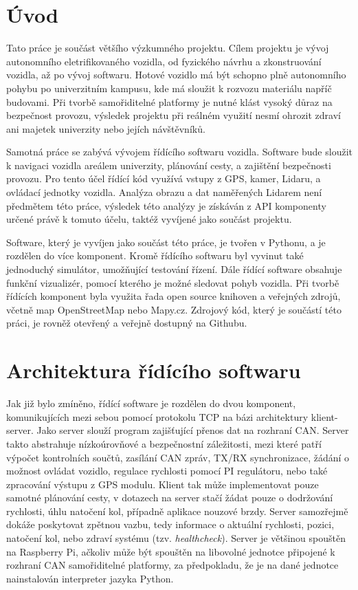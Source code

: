 \documentclass[czech, bachelor]{diploma}
\begin{document}
\MakeTitlePages

\chapter{Úvod} \label{sec:Introduction}
Tato práce je součást většího výzkumného projektu. Cílem projektu je vývoj autonomního eletrifikovaného vozidla,
od fyzického návrhu a zkonstruování vozidla, až po vývoj softwaru. Hotové vozidlo má být schopno plně autonomního pohybu
po univerzitním kampusu, kde má sloužit k rozvozu materiálu napříč budovami. Při tvorbě samořiditelné platformy je nutné
klást vysoký důraz na bezpečnost provozu, výsledek projektu při reálném využití nesmí ohrozit zdraví ani majetek
univerzity nebo jejích návštěvníků.

Samotná práce se zabývá vývojem řídícího softwaru vozidla. Software bude sloužit k navigaci vozidla areálem univerzity,
plánování cesty, a zajištění bezpečnosti provozu. Pro tento účel řídící kód využívá vstupy z GPS, kamer, Lidaru,
a ovládací jednotky vozidla. Analýza obrazu a dat naměřených Lidarem není předmětem této práce, výsledek této analýzy
je získáván z API komponenty určené právě k tomuto účelu, taktéž vyvíjené jako součást projektu.

Software, který je vyvíjen jako součást této práce, je tvořen v Pythonu, a je rozdělen do více komponent. Kromě řídícího
softwaru byl vyvinut také jednoduchý simulátor, umožňující testování řízení. Dále řídící software obsahuje funkční
vizualizér, pomocí kterého je možné sledovat pohyb vozidla. Při tvorbě řídících komponent byla využita řada open source
knihoven a veřejných zdrojů, včetně map OpenStreetMap nebo Mapy.cz. Zdrojový kód, který je součástí této práci, je
rovněž otevřený a veřejně dostupný na Githubu.

\chapter{Architektura řídícího softwaru} \label{software-architecture}
Jak již bylo zmíněno, řídící software je rozdělen do dvou komponent, komunikujících mezi sebou pomocí protokolu TCP na bázi
architektury klient-server. Jako server slouží program zajišťující přenos dat na rozhraní CAN. Server takto abstrahuje
nízkoúrovňové a bezpečnostní záležitosti, mezi které patří výpočet kontrolních součtů, zasílání CAN zpráv, TX/RX synchronizace,
žádání o možnost ovládat vozidlo, regulace rychlosti pomocí PI regulátoru, nebo také zpracování výstupu z GPS modulu. Klient tak
může implementovat pouze samotné plánování cesty, v dotazech na server stačí žádat pouze o dodržování rychlosti, úhlu natočení
kol, případně aplikace nouzové brzdy. Server samozřejmě dokáže poskytovat zpětnou vazbu, tedy informace o aktuální rychlosti,
pozici, natočení kol, nebo zdraví systému (tzv. \emph{healthcheck}). Server je většinou spouštěn na Raspberry Pi, ačkoliv může
být spouštěn na libovolné jednotce připojené k rozhraní CAN samořiditelné platformy, za předpokladu, že je na dané jednotce
nainstalován interpreter jazyka Python.
\end{document}
